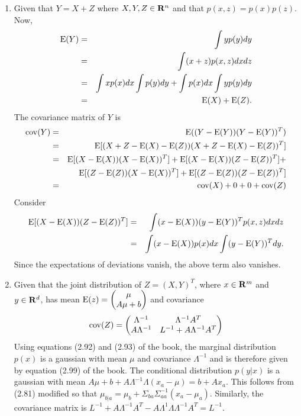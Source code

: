 \begin{enumerate}
\item Given that $Y = X + Z$ where $X, Y, Z \in \mathbf{R}^n$ and that $p(x, z) = p(x)p(z)$. Now,
\begin{eqnarray*}
\operatorname{E}(Y) &=& \int yp(y)dy \\
 &=& \int (x + z)p(x, z)dxdz \\
 &=& \int xp(x)dx\int p(y)dy + \int p(x)dx\int yp(y)dy \\
 &=& \operatorname{E}(X) + \operatorname{E}(Z).
\end{eqnarray*}
The covariance matrix of $Y$ is 
\begin{eqnarray*}
\operatorname{cov}(Y) &=& \operatorname{E}((Y - \operatorname{E}(Y))(Y - \operatorname{E}(Y))^T) \\
 &=& \operatorname{E}[(X + Z - \operatorname{E}(X) - \operatorname{E}(Z))(X + Z - \operatorname{E}(X) - \operatorname{E}(Z))^T] \\
 &=& \operatorname{E}[(X - \operatorname{E}(X))(X - \operatorname{E}(X))^T] + \operatorname{E}[(X - \operatorname{E}(X))(Z - \operatorname{E}(Z))^T] + \\
 & & \operatorname{E}[(Z - \operatorname{E}(Z))(X -\operatorname{E}(X))^T] + \operatorname{E}[(Z - \operatorname{E}(Z))(Z - \operatorname{E}(Z))^T] \\
 &=& \operatorname{cov}(X) + 0 + 0 + \operatorname{cov}(Z)
\end{eqnarray*}
Consider 
\begin{eqnarray*}
\operatorname{E}[(X - \operatorname{E}(X))(Z - \operatorname{E}(Z))^T] &=& \int (x - \operatorname{E}(X))(y - \operatorname{E}(Y))^Tp(x, z)dxdz \\
 &=& \int (x - \operatorname{E}(X))p(x)dx \int (y - \operatorname{E}(Y))^Tdy.
\end{eqnarray*}
Since the expectations of deviations vanish, the above term also vanishes.

\item Given that the joint distribution of $Z = (X, Y)^T$, where $x \in \mathbf{R}^m$ and $y \in \mathbf{R}^d$, has mean
$\operatorname{E}(z) = \begin{pmatrix} \mu \\ A\mu + b \end{pmatrix}$ and covariance
\[
\operatorname{cov}(Z) = \begin{pmatrix} \Lambda^{-1} & \Lambda^{-1}A^T \\
A\Lambda^{-1} & L^{-1} + A\Lambda^{-1}A^T \end{pmatrix}
\]
Using equations (2.92) and (2.93) of the book, the marginal distribution $p(x)$ is a gaussian with mean
$\mu$ and covariance $\Lambda^{-1}$ and is therefore given by equation (2.99) of the book. The conditional
distribution $p(y|x)$ is a gaussian with mean $A\mu + b + A\Lambda^{-1}\Lambda(x_a - \mu) = b + Ax_a$. This
follows from (2.81) modified so that $\mu_{b|a} = \mu_b + \Sigma_{ba}\Sigma_{aa}^{-1}(x_a - \mu_a)$. Similarly,
the covariance matrix is $L^{-1} + A\Lambda^{-1}A^T - A\Lambda^{1}\Lambda\Lambda^{-1}A^T = L^{-1}$.


\end{enumerate}
